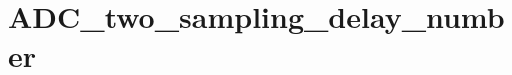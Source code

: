 \hypertarget{group___a_d_c__two__sampling__delay__number}{\section{A\-D\-C\-\_\-two\-\_\-sampling\-\_\-delay\-\_\-number}
\label{group___a_d_c__two__sampling__delay__number}
}
